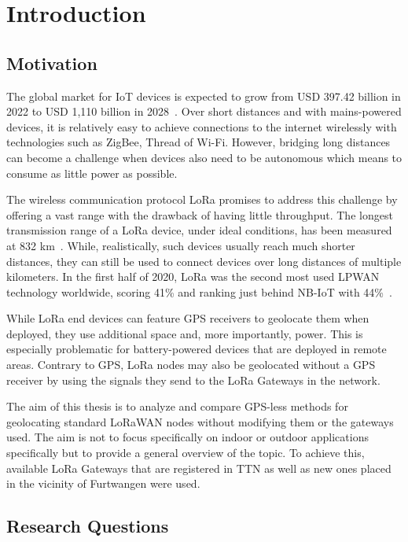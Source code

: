 \chapter{Introduction}

\section{Motivation}

The global market for \ac{IoT} devices is expected to grow from USD 397.42 billion in 2022 to USD 1,110 billion in 2028~\cite{lionel_sujay_vailshery_global_2022}.
Over short distances and with mains-powered devices, it is relatively easy to achieve connections to the internet wirelessly with technologies such as ZigBee, Thread of Wi-Fi.
However, bridging long distances can become a challenge when devices also need to be autonomous which means to consume as little power as possible.

The wireless communication protocol \ac{LoRa} promises to address this challenge by offering a vast range with the drawback of having little throughput.
The longest transmission range of a \ac{LoRa} device, under ideal conditions, has been measured at 832 km~\cite{the_things_network_global_team_lora_nodate}.
While, realistically, such devices usually reach much shorter distances, they can still be used to connect devices over long distances of multiple kilometers.
In the first half of 2020, \ac{LoRa} was the second most used \ac{LPWAN} technology worldwide, scoring 41\% and ranking just behind NB-IoT with 44\%~\cite{iot_analytics_lpwa_2020}.

While \ac{LoRa} end devices can feature \ac{GPS} receivers to geolocate them when deployed, they use additional space and, more importantly, power.
This is especially problematic for battery-powered devices that are deployed in remote areas.
Contrary to \ac{GPS}, \ac{LoRa} nodes may also be geolocated without a \ac{GPS} receiver by using the signals they send to the \ac{LoRa} Gateways in the network.

The aim of this thesis is to analyze and compare \ac{GPS}-less methods for geolocating standard \ac{LoRaWAN} nodes without modifying them or the gateways used.
The aim is not to focus specifically on indoor or outdoor applications specifically but to provide a general overview of the topic.
To achieve this, available \ac{LoRa} Gateways that are registered in \acf{TTN} as well as new ones placed in the vicinity of Furtwangen were used.

\section{Research Questions}

